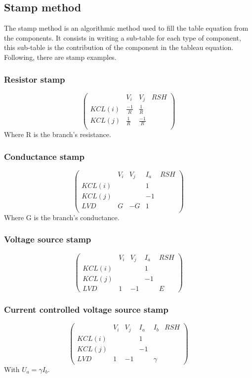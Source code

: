 \subsection{Stamp method}
The stamp method is an algorithmic method used to fill the table equation from the components. It
consists in writing a sub-table for each type of component, this sub-table is the contribution of the component in the tableau equation.\\
Following, there are stamp examples.
\subsubsection{Resistor stamp}
\[\left(\begin{array}{cccc}
&V_{i}&V_{j}&RSH\\
  \hline
  KCL(i)&\frac{-1}{R}&\frac{1}{R}&\\
  KCL(j)&\frac{1}{R}&\frac{-1}{R}&\\
  \end{array}\right)
\]
Where R is the branch's resistance.
\subsubsection{Conductance stamp}
\[\left(\begin{array}{ccccc}
&V_{i}&V_{j}&I_{a}&RSH\\
  \hline
  KCL(i)&&&1&\\
  KCL(j)&&&-1&\\
  LVD&G&-G&1&\\
  \end{array}\right)
\]
Where G is the branch's conductance.
\subsubsection{Voltage source stamp}
\[\left(\begin{array}{ccccc}
&V_{i}&V_{j}&I_{a}&RSH\\
  \hline
  KCL(i)&&&1\\
  KCL(j)&&&-1\\
  LVD&1&-1&&E
  \end{array}\right)
\]
\subsubsection{Current controlled voltage source stamp}
\[\left(\begin{array}{cccccc}
&V_{i}&V_{j}&I_{a}&I_{b}&RSH\\
  \hline
  KCL(i)&&&1&\\
  KCL(j)&&&-1&\\
  LVD&1&-1&&\gamma
  \end{array}\right)
\]
With $U_{a} = \gamma I_{b}$.


